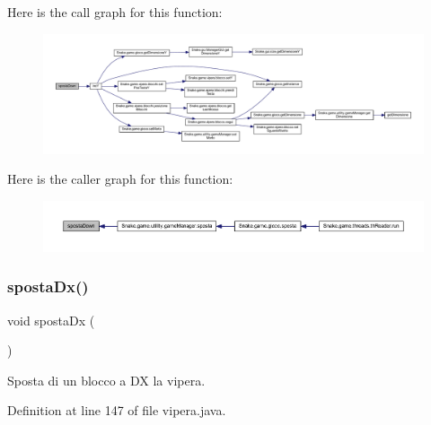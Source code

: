 Here is the call graph for this function\+:
\nopagebreak
\begin{figure}[H]
\begin{center}
\leavevmode
\includegraphics[width=350pt]{class_snake_1_1game_1_1vipera_1_1vipera_a00853f3bb0a1c94d5a67c763d29acd84_cgraph}
\end{center}
\end{figure}
Here is the caller graph for this function\+:
\nopagebreak
\begin{figure}[H]
\begin{center}
\leavevmode
\includegraphics[width=350pt]{class_snake_1_1game_1_1vipera_1_1vipera_a00853f3bb0a1c94d5a67c763d29acd84_icgraph}
\end{center}
\end{figure}
\mbox{\label{class_snake_1_1game_1_1vipera_1_1vipera_a2bb91b033817cdbd85ff3c137b3d32db}} 
\subsubsection{\texorpdfstring{sposta\+Dx()}{spostaDx()}}
{\footnotesize\ttfamily void sposta\+Dx (\begin{DoxyParamCaption}{ }\end{DoxyParamCaption})}



Sposta di un blocco a DX la vipera. 



Definition at line 147 of file vipera.\+java.

